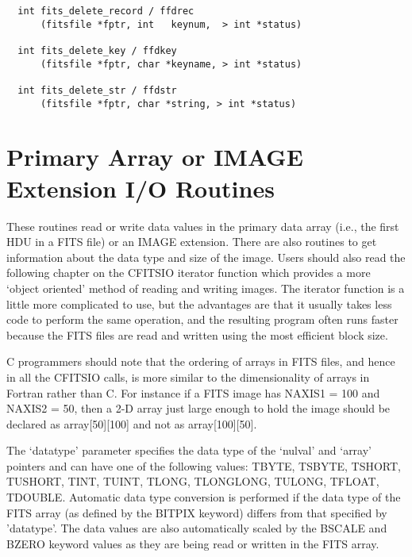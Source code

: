 \documentclass[11pt]{book}
\begin{document}
\begin{verbatim}
  int fits_delete_record / ffdrec
      (fitsfile *fptr, int   keynum,  > int *status)

  int fits_delete_key / ffdkey
      (fitsfile *fptr, char *keyname, > int *status)

  int fits_delete_str / ffdstr
      (fitsfile *fptr, char *string, > int *status)
\end{verbatim}

\section{Primary Array or IMAGE Extension I/O Routines}

These routines read or write data values in the primary data array (i.e.,
the first HDU in a FITS file) or an IMAGE extension.   There are also
routines to get information about the data type and size of the image.
Users should also read the following chapter on the CFITSIO iterator
function which provides a more `object oriented' method of reading and
writing images.  The iterator function is a little more complicated to
use, but the advantages are that it usually takes less code to perform
the same operation, and the resulting program often runs faster because
the FITS files are read and written using the most efficient block size.

C programmers should note that the ordering of arrays in FITS files, and
hence in all the CFITSIO calls, is more similar to the dimensionality
of arrays in Fortran rather than C.  For instance if a FITS image has
NAXIS1 = 100 and NAXIS2 = 50, then a 2-D array just large enough to hold
the image should be declared as array[50][100] and not as array[100][50].

The `datatype'  parameter specifies the data type of the `nulval'  and
`array' pointers and can have one of the following  values:  TBYTE,
TSBYTE, TSHORT, TUSHORT, TINT, TUINT, TLONG, TLONGLONG, TULONG, TFLOAT,
TDOUBLE.  Automatic data type conversion is performed if the data type
of the FITS array (as defined by the BITPIX keyword) differs from that
specified by 'datatype'.  The data values are also automatically scaled
by the BSCALE and BZERO keyword values as they are being read or written
in the FITS array.
\end{document}
